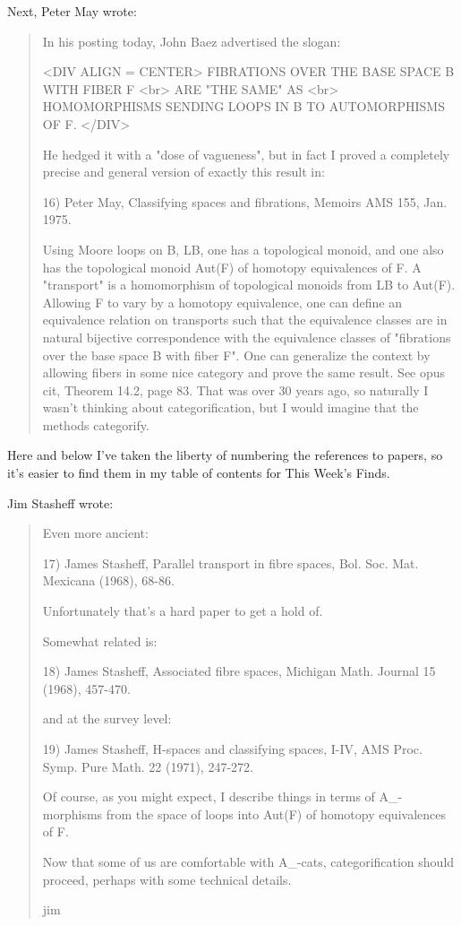 Next, Peter May wrote: 

\begin{quote}
 In his posting today, John Baez advertised the slogan:

<DIV ALIGN = CENTER>
              FIBRATIONS OVER THE BASE SPACE B WITH FIBER F <br>
                           ARE "THE SAME" AS <br>
          HOMOMORPHISMS SENDING LOOPS IN B TO AUTOMORPHISMS OF F.
</DIV>

 He hedged it with a "dose of vagueness", but in fact I proved a
 completely precise and general version of exactly this result in:

16) Peter May, Classifying spaces and fibrations, 
Memoirs AMS 155, Jan. 1975.  

 Using
 Moore loops on B, LB, one has a topological monoid, and one also has the
 topological monoid Aut(F) of homotopy equivalences of F.  
 A "transport"
 is a homomorphism of topological monoids from LB to Aut(F).  Allowing F to
 vary by a homotopy equivalence, one can define an equivalence relation on
 transports such that the equivalence classes are in natural bijective
 correspondence with the equivalence classes of "fibrations over the base
 space B with fiber F".  One can generalize the context by allowing fibers
 in some nice category and prove the same result.  See opus cit, Theorem
 14.2, page 83.  That was over 30 years ago, so naturally I wasn't thinking
 about categorification, but I would imagine that the methods categorify.
\end{quote}

Here and below I've taken the liberty of numbering the references to
papers, so it's easier to find them in my table of contents for This
Week's Finds.  

Jim Stasheff wrote:

\begin{quote}
 Even more ancient:

 
17) James Stasheff, 
 Parallel transport in fibre spaces, Bol. Soc. Mat. Mexicana (1968), 68-86.

 Unfortunately that's a hard paper to get a hold of.

 Somewhat related is:

18) James Stasheff, 
 Associated fibre spaces, Michigan Math. Journal 15 (1968), 457-470.

 and at the survey level:

19) James Stasheff, 
 H-spaces and classifying spaces, I-IV, AMS Proc. Symp. Pure Math.
 22 (1971), 247-272.

 Of course, as you might expect, I describe things in terms of
 A_{\infty }-morphisms from the space of loops into Aut(F) of homotopy 
 equivalences of F.

 Now that some of us are comfortable with A_{\infty }-cats,
 categorification should proceed, perhaps with some technical details.

 jim
\end{quote}

